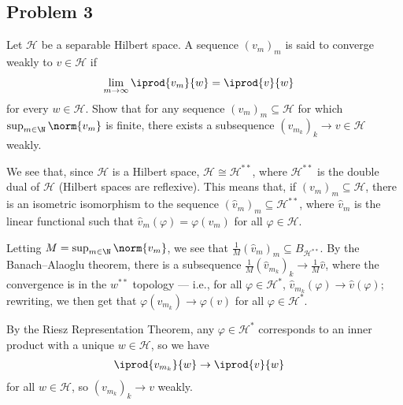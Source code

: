 \documentclass[10pt]{mypackage}
\begin{document}
\subsection{Problem 3}%
\begin{problem}
  Let $\mathcal{H}$ be a separable Hilbert space. A sequence $\left( v_m \right)_m$ is said to converge weakly to $v\in \mathcal{H}$ if
  \begin{align*}
    \lim_{m\rightarrow\infty} \iprod{v_m}{w} &= \iprod{v}{w}
  \end{align*}
  for every $w\in \mathcal{H}$. Show that for any sequence $\left( v_m \right)_m\subseteq \mathcal{H}$ for which $\sup_{m\in\N} \norm{v_m}$ is finite, there exists a subsequence $\left( v_{m_{k}} \right)_k\rightarrow v\in \mathcal{H}$ weakly.
\end{problem}
We see that, since $\mathcal{H}$ is a Hilbert space, $\mathcal{H}\cong \mathcal{H}^{\ast\ast}$, where $\mathcal{H}^{\ast\ast}$ is the double dual of $\mathcal{H}$ (Hilbert spaces are reflexive). This means that, if $\left( v_m \right)_m\subseteq \mathcal{H}$, there is an isometric isomorphism to the sequence $\left( \hat{v}_m \right)_m\subseteq \mathcal{H}^{\ast\ast}$, where $\hat{v}_m$ is the linear functional such that $\hat{v}_m(\varphi) = \varphi\left( v_m \right)$ for all $\varphi\in \mathcal{H}$.\newline

Letting $M = \sup_{m\in \N} \norm{v_m}$, we see that $\frac{1}{M} \left( \hat{v}_m \right)_m\subseteq B_{\mathcal{H}^{\ast\ast}}$. By the Banach--Alaoglu theorem, there is a subsequence $\frac{1}{M}\left( \hat{v}_{m_k} \right)_k\rightarrow \frac{1}{M}\hat{v}$, where the convergence is in the $w^{\ast\ast}$ topology --- i.e., for all $\varphi\in \mathcal{H}^{\ast}$, $\hat{v}_{m_{k}}\left( \varphi \right)\rightarrow \hat{v}\left( \varphi \right)$; rewriting, we then get that $\varphi\left( v_{m_{k}} \right) \rightarrow \varphi\left( v \right)$ for all $\varphi\in \mathcal{H}^{\ast}$.\newline

By the Riesz Representation Theorem, any $\varphi\in \mathcal{H}^{\ast}$ corresponds to an inner product with a unique $w\in \mathcal{H}$, so we have
\begin{align*}
  \iprod{v_{m_{k}}}{w} &\rightarrow \iprod{v}{w}
\end{align*}
for all $w\in \mathcal{H}$, so $\left( v_{m_{k}} \right)_k\rightarrow v$ weakly.
\end{document}
